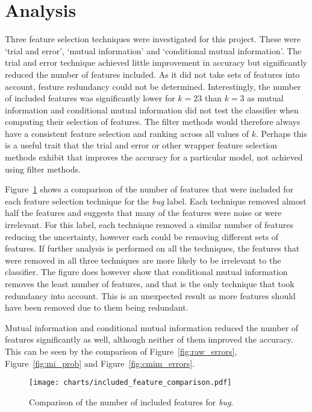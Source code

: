 \section{Analysis}
Three feature selection techniques were investigated for this project. These were `trial and error', `mutual information' and
`conditional mutual information'. The trial and error technique achieved little improvement in accuracy but significantly
reduced the number of features included. As it did not take sets of features into account, feature redundancy could not be
determined. Interestingly, the number of included features was significantly lower for $k = 23$ than $k = 3$ as mutual
information and conditional mutual information did not test the classifier when computing their selection of features. The
filter methods would therefore always have a consistent feature selection and ranking across all values of $k$. Perhaps this is
a useful trait that the trial and error or other wrapper feature selection methods exhibit that improves the accuracy for a
particular model, not achieved using filter methods.

Figure~\ref{fig:inc_feature_comparison_bug} shows a comparison of the number of features that were included for each feature
selection technique for the \textit{bug} label. Each technique removed almost half the features and suggests that many of the
features were noise or were irrelevant. For this label, each technique removed a similar number of features reducing the
uncertainty, however each could be removing different sets of features. If further analysis is performed on all the techniques,
the features that were removed in all three techniques are more likely to be irrelevant to the classifier. The figure does
however show that conditional mutual information removes the least number of features, and that is the only technique that took
redundancy into account. This is an unexpected result as more features should have been removed due to them being redundant.

Mutual information and conditional mutual information reduced the number of features significantly as well, although neither
of them improved the accuracy. This can be seen by the comparison of Figure~\ref{fig:raw_errors}, Figure~\ref{fig:mi_prob} and
Figure~\ref{fig:cmim_errors}.

\begin{figure}[h]
    \centering
    \texttt{[image: charts/included\_feature\_comparison.pdf]}
    \caption{Comparison of the number of included features for \textit{bug}.}
    \label{fig:inc_feature_comparison_bug}
\end{figure}

